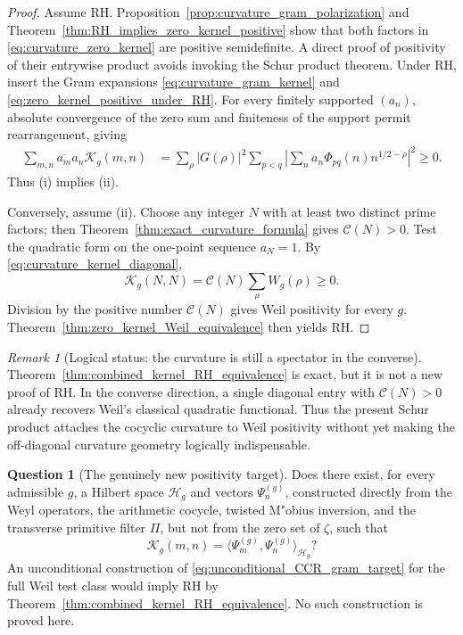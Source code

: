 \documentclass[11pt]{amsart}
\numberwithin{equation}{section}
\theoremstyle{plain}
\theoremstyle{definition}
\newtheorem{question}[theorem]{Question}
\theoremstyle{remark}
\newtheorem{remark}[theorem]{Remark}
\begin{document}
\begin{proof}
Assume RH.  Proposition~\ref{prop:curvature_gram_polarization} and
Theorem~\ref{thm:RH_implies_zero_kernel_positive} show that both factors in
\eqref{eq:curvature_zero_kernel} are positive semidefinite.  A direct proof
of positivity of their entrywise product avoids invoking the Schur product
theorem.  Under RH, insert the Gram expansions
\eqref{eq:curvature_gram_kernel} and
\eqref{eq:zero_kernel_positive_under_RH}.  For every finitely supported
\((a_n)\), absolute convergence of the zero sum and finiteness of the support
permit rearrangement, giving
\begin{align}
\sum_{m,n}\overline{a_m}a_n\mathscr K_g(m,n)
&=\sum_{\rho}|G(\rho)|^2
\sum_{p<q}
\left|\sum_n a_n\Phi_{pq}(n)n^{1/2-\rho}\right|^2
\ge0.
\label{eq:combined_kernel_channel_sum}
\end{align}
Thus (i) implies (ii).

Conversely, assume (ii).  Choose any integer \(N\) with at least two distinct
prime factors; then Theorem~\ref{thm:exact_curvature_formula} gives
\(\mathcal C(N)>0\).  Test the quadratic form on the one-point sequence
\(a_N=1\).  By \eqref{eq:curvature_kernel_diagonal},
\begin{equation}
\mathscr K_g(N,N)
=\mathcal C(N)\sum_\rho W_g(\rho)\ge0.
\label{eq:combined_kernel_diagonal_Weil}
\end{equation}
Division by the positive number \(\mathcal C(N)\) gives Weil positivity for
every \(g\).  Theorem~\ref{thm:zero_kernel_Weil_equivalence} then yields RH.
\end{proof}

\begin{remark}[Logical status: the curvature is still a spectator in the converse]
\label{rem:curvature_spectator}
Theorem~\ref{thm:combined_kernel_RH_equivalence} is exact, but it is not a new
proof of RH.  In the converse direction, a single diagonal entry with
\(\mathcal C(N)>0\) already recovers Weil's classical quadratic functional.
Thus the present Schur product attaches the cocyclic curvature to Weil
positivity without yet making the off-diagonal curvature geometry logically
indispensable.
\end{remark}

\begin{question}[The genuinely new positivity target]
\label{q:unconditional_CCR_gram_realization}
Does there exist, for every admissible \(g\), a Hilbert space
\(\mathcal H_g\) and vectors \(\Psi_n^{(g)}\), constructed directly from the
Weyl operators, the arithmetic cocycle, twisted M"obius inversion, and the
transverse primitive filter \(\Pi\), but not from the zero set of \(\zeta\),
such that
\begin{equation}
\boxed{
\mathscr K_g(m,n)
=\langle\Psi_m^{(g)},\Psi_n^{(g)}\rangle_{\mathcal H_g}?}
\label{eq:unconditional_CCR_gram_target}
\end{equation}
An unconditional construction of \eqref{eq:unconditional_CCR_gram_target}
for the full Weil test class would imply RH by
Theorem~\ref{thm:combined_kernel_RH_equivalence}.  No such construction is
proved here.
\end{question}
\end{document}
